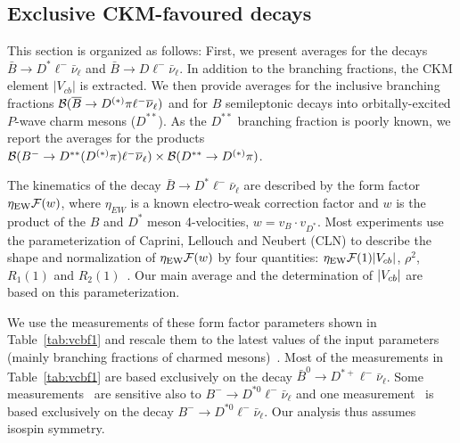 \subsection{Exclusive CKM-favoured decays}
\label{slbdecays_b2cexcl}
This section is organized as follows: First, we present averages for
the decays $\bar B\to D^*\ell^-\bar\nu_\ell$ and $\bar B\to
D\ell^-\bar\nu_\ell$. In addition to the branching fractions, the CKM
element $|V_{cb}|$ is extracted. We then provide
averages for the inclusive branching fractions $\cbf(\bar B\to
D^{(*)}\pi \ell^-\bar\nu_\ell)$ and for $B$ semileptonic decays into
orbitally-excited $P$-wave charm mesons ($D^{**}$). As the $D^{**}$
branching fraction is poorly known, we report the averages for the products 
$\cbf(B^-\to D^{**}(D^{(*)}\pi)\ell^-\bar\nu_\ell)\times
\cbf(D^{**}\to D^{(*)}\pi)$.


\label{slbdecays_dstarlnu}

The kinematics of the decay $\bar B\to D^*\ell^-\bar\nu_\ell$ are
described by the form factor $\eta_\mathrm{EW}{\cal F}(w)$, where
$\eta_{EW}$ is a known electro-weak correction factor and $w$ is the
product of the $B$ and $D^*$ meson 4-velocities, $w=v_B\cdot
v_{D^*}$. Most experiments use the parameterization of Caprini,
Lellouch and Neubert (CLN) to describe the shape and normalization of
$\eta_\mathrm{EW}{\cal F}(w)$ by four quantities:
$\eta_\mathrm{EW}{\cal F}(1)|V_{cb}|$, $\rho^2$, $R_1(1)$ and
$R_2(1)$~\cite{CLN}. Our main average and the determination of $|V_{cb}|$
are based on this parameterization.

We use the measurements of these form factor parameters shown in
Table~\ref{tab:vcbf1} and rescale them to the latest values of the
input parameters (mainly branching fractions of charmed
mesons)~\cite{HFAG_sl:inputparams}. Most of the measurements in
Table~\ref{tab:vcbf1} are based exclusively on the decay $\bar B^0\to
D^{*+}\ell^-\bar\nu_\ell$. Some
measurements~\cite{Adam:2002uw,Aubert:2009_1} are sensitive also to
$B^-\to D^{*0}\ell^-\bar\nu_\ell$ and one
measurement~\cite{Aubert:2009_3} is based exclusively on the decay
$B^-\to D^{*0}\ell^-\bar\nu_\ell$. Our analysis thus assumes isospin
symmetry.



